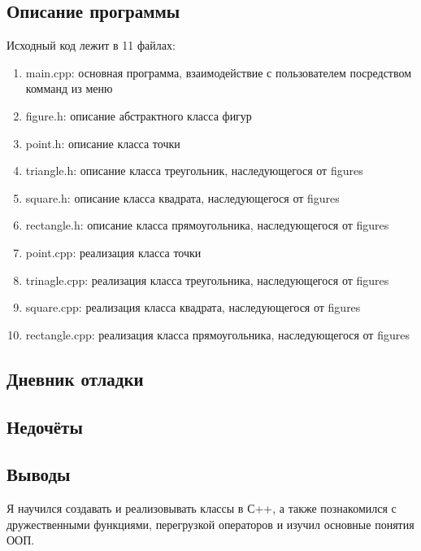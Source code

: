\documentclass[12pt]{article}
\begin{document}
\subsection*{Описание программы}

Исходный код лежит в 11 файлах:
\begin{enumerate}
\item main.cpp: основная программа, взаимодействие с пользователем посредством комманд из меню

\item figure.h:    описание абстрактного класса фигур

\item point.h:     описание класса точки
\item triangle.h:  описание класса треугольник, наследующегося от figures
\item square.h: описание класса квадрата, наследующегося от figures
\item rectangle.h:    описание класса прямоугольника, наследующегося от figures

\item point.cpp:     реализация класса точки
\item trinagle.cpp:  реализация класса треугольника, наследующегося от figures
\item square.cpp: реализация класса квадрата, наследующегося от figures
\item rectangle.cpp:    реализация класса прямоугольника, наследующегося от figures

\end{enumerate}

\subsection*{Дневник отладки}


\subsection*{Недочёты}


\subsection*{Выводы}

Я научился создавать и реализовывать классы в С++, а также познакомился с дружественными функциями, перегрузкой операторов и изучил основные понятия ООП.


\vfill
\end{document}
